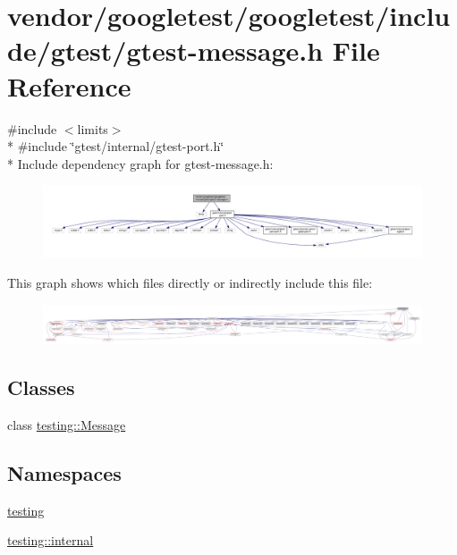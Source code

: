 \hypertarget{gtest-message_8h}{}\section{vendor/googletest/googletest/include/gtest/gtest-\/message.h File Reference}
\label{gtest-message_8h}
{\ttfamily \#include $<$limits$>$}\\*
{\ttfamily \#include \char`\"{}gtest/internal/gtest-\/port.\+h\char`\"{}}\\*
Include dependency graph for gtest-\/message.h\+:\nopagebreak
\begin{figure}[H]
\begin{center}
\leavevmode
\includegraphics[width=350pt]{gtest-message_8h__incl}
\end{center}
\end{figure}
This graph shows which files directly or indirectly include this file\+:\nopagebreak
\begin{figure}[H]
\begin{center}
\leavevmode
\includegraphics[width=350pt]{gtest-message_8h__dep__incl}
\end{center}
\end{figure}
\subsection*{Classes}
\begin{DoxyCompactItemize}
\item 
class \hyperlink{classtesting_1_1Message}{testing\+::\+Message}
\end{DoxyCompactItemize}
\subsection*{Namespaces}
\begin{DoxyCompactItemize}
\item 
 \hyperlink{namespacetesting}{testing}
\item 
 \hyperlink{namespacetesting_1_1internal}{testing\+::internal}
\end{DoxyCompactItemize}

